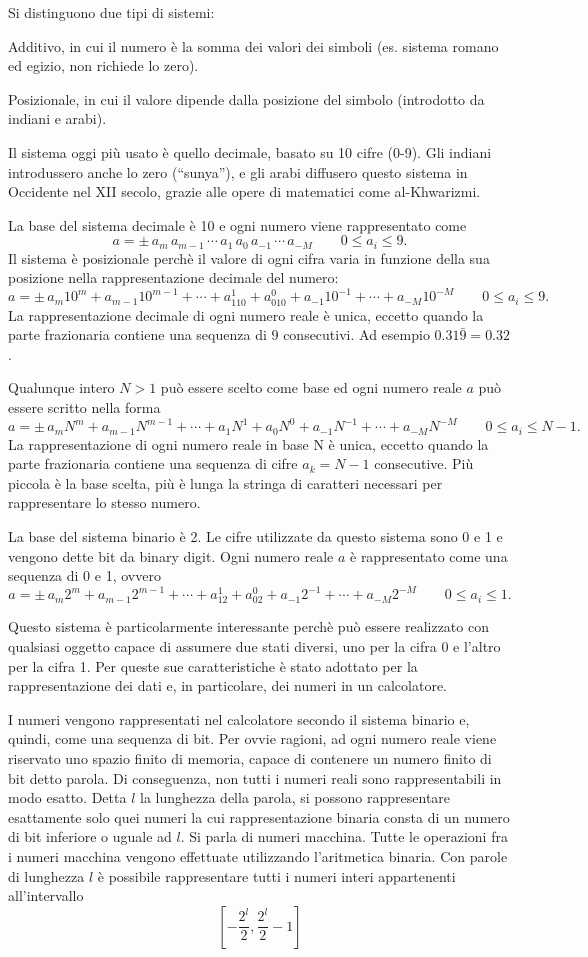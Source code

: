 \documentclass[a4paper,12pt]{article}
\theoremstyle{plain}
\theoremstyle{definition}
\theoremstyle{remark}
\begin{document}
Si distinguono due tipi di sistemi:

Additivo, in cui il numero è la somma dei valori dei simboli (es. sistema romano ed egizio, 
non richiede lo zero).

Posizionale, in cui il valore dipende dalla posizione del simbolo (introdotto da indiani e arabi).

Il sistema oggi più usato è quello decimale, basato su 10 cifre (0-9). Gli indiani introdussero 
anche lo zero (“sunya”), e gli arabi diffusero questo sistema in Occidente nel XII secolo, grazie 
alle opere di matematici come al-Khwarizmi.

La base del sistema decimale è 10 e ogni numero viene rappresentato come 
\[a=\pm\, a_m\,a_{m-1}\,\cdots\, a_1\,a_0\,a_{-1}\,\cdots \,a_{-M}\quad\quad 0\leq a_i\leq 9.\]
Il sistema è posizionale perchè il valore di ogni cifra varia in funzione della sua posizione nella rappresentazione decimale del numero:
\[a=\pm\, a_m10^m+a_{m-1}10^{m-1}+\cdots+ a_110^1+a_010^0+a_{-1}10^{-1}+\cdots +a_{-M}10^{-M}\quad\quad 0\leq a_i\leq 9.\]
La rappresentazione decimale di ogni numero reale è unica, eccetto quando la parte frazionaria contiene una sequenza di 9 consecutivi.
Ad esempio $0.31\bar{9}=0.32$.

Qualunque intero $N > 1$ può essere scelto come base ed ogni numero reale $a$ può essere scritto nella forma
\[a=\pm\, a_mN^m+a_{m-1}N^{m-1}+\cdots+ a_1N^1+a_0N^0+a_{-1}N^{-1}+\cdots +a_{-M}N^{-M}\quad\quad 0\leq a_i\leq N-1.\]
La rappresentazione di ogni numero reale in base N è unica, eccetto quando la parte frazionaria contiene una sequenza di cifre $a_k=N-1$ consecutive.
Più piccola è la base scelta, più è lunga la stringa di caratteri necessari per rappresentare lo stesso numero.

La base del sistema binario è 2.
Le cifre utilizzate da questo sistema sono 0 e 1 e vengono dette bit da
binary digit.
Ogni numero reale $a$ è rappresentato come una sequenza di 0 e 1,
ovvero
\[a=\pm\, a_m2^m+a_{m-1}2^{m-1}+\cdots+ a_12^1+a_02^0+a_{-1}2^{-1}+\cdots +a_{-M}2^{-M}\quad\quad 0\leq a_i\leq 1.\]

Questo sistema è particolarmente interessante perchè può essere
realizzato con qualsiasi oggetto capace di assumere due stati diversi,
uno per la cifra 0 e l'altro per la cifra 1.
Per queste sue caratteristiche è stato adottato per la rappresentazione
dei dati e, in particolare, dei numeri in un calcolatore.

I numeri vengono rappresentati nel calcolatore secondo il sistema
binario e, quindi, come una sequenza di bit.
Per ovvie ragioni, ad ogni numero reale viene riservato uno spazio
finito di memoria, capace di contenere un numero finito di bit detto
parola.
Di conseguenza, non tutti i numeri reali sono rappresentabili in modo
esatto.
Detta $l$ la lunghezza della parola, si possono rappresentare
esattamente solo quei numeri la cui rappresentazione binaria consta di
un numero di bit inferiore o uguale ad $l$.
Si parla di numeri macchina.
Tutte le operazioni fra i numeri macchina vengono effettuate
utilizzando l'aritmetica binaria.
Con parole di lunghezza $l$ è possibile rappresentare tutti i numeri
interi appartenenti all'intervallo 
\[\left[-\dfrac{2^l}{2},\dfrac{2^l}{2}-1\right]\]
\end{document}
